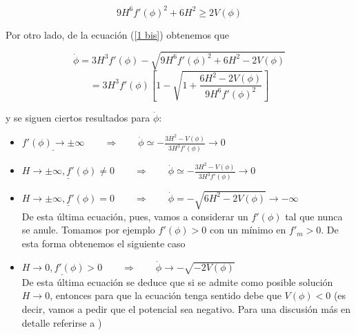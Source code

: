 \begin{equation}\label{V menor 2}
9H^6f'(\phi)^2+6H^2 \geq 2V(\phi)
\end{equation}




Por otro lado, de la ecuación (\ref{1 bis}) obtenemos que 

$$
\dot{\phi}=3H^3f'(\phi)-\sqrt{9H^6f'(\phi)^2+6H^2-2V(\phi)}
$$
\begin{equation}\label{rama negativa}
=3H^3f'(\phi)\left[ 1-\sqrt{1+\frac{6H^2-2V(\phi)}{9H^6f'(\phi)^2}}\right]
\end{equation}

y se siguen ciertos resultados para $\dot{\phi}$:

\begin{itemize}
    \item $\underline{f'(\phi)\to \pm \infty} \qquad \Longrightarrow \qquad\dot{\phi}\simeq -\frac{3H^2-V(\phi)}{3H^3f'(\phi)}\longrightarrow 0$
    \item $\underline{H\to \pm \infty, f'(\phi)\neq 0} \qquad \Longrightarrow \qquad \dot{\phi}\simeq -\frac{3H^2-V(\phi)}{3H^3f'(\phi)}\longrightarrow 0$
    \item $\underline{H\to \pm \infty, f'(\phi)=0} \qquad \Longrightarrow \qquad \dot{\phi}=-\sqrt{6H^2-2V(\phi)}\longrightarrow  -\infty$ \\
    De esta última ecuación, pues, vamos a considerar un $f'(\phi)$ tal que nunca se anule. Tomamos por ejemplo $f'(\phi)>0$ con un mínimo en $f'_m>0$. De esta forma obtenemos el siguiente caso 
    \item $\underline{H\to 0,f'(\phi)>0}\qquad \Longrightarrow \qquad \dot{\phi}\longrightarrow -\sqrt{-2V(\phi)}$ \\
    De esta última ecuación se deduce que si se admite como posible solución $H\to 0$, entonces para que la ecuación tenga sentido debe que $V(\phi)<0$ (es decir, vamos a pedir que el potencial sea negativo. Para una discusión más en detalle referirse a \citep{2011CQGra..28t4004L})
\end{itemize}





